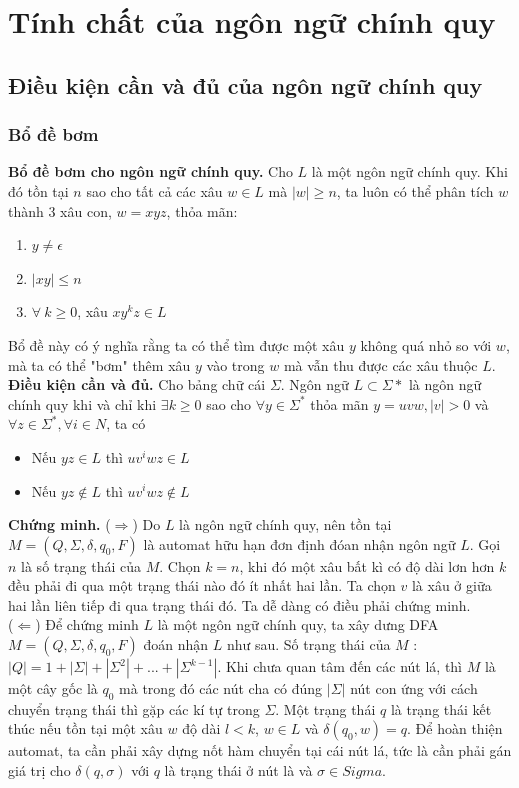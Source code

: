 \documentclass[14pt]{extreport}
\begin{document}
\chapter{Tính chất của ngôn ngữ chính quy}
\section{Điều kiện cần và đủ của ngôn ngữ chính quy}
\subsection{Bổ đề bơm}
\textbf{Bổ đề bơm cho ngôn ngữ chính quy.} Cho $L$ là một ngôn ngữ chính quy. Khi đó tồn tại $n$ sao cho tất cả các xâu $w \in L$ mà $|w| \geq n$, ta luôn có thể phân tích $w$ thành 3 xâu con, $w = xyz$, thỏa mãn:
\begin{enumerate}
\item $y \neq \epsilon$
\item $|xy| \leq n$
\item $\forall \ k \geq 0$, xâu $xy^kz \in L$
\end{enumerate}
Bổ đề này có ý nghĩa rằng ta có thể tìm được một xâu $y$ không quá nhỏ so với $w$, mà ta có thể "bơm" thêm xâu $y$ vào trong $w$ mà vẫn thu được các xâu thuộc $L$.\\
\textbf{Điều kiện cần và đủ.} Cho bảng chữ cái $\Sigma$. Ngôn ngữ $L \subset \Sigma*$ là ngôn ngữ chính quy khi và chỉ khi $\exists k \geq 0$ sao cho $\forall y \in \Sigma^*$ thỏa mãn $y = uvw, |v| > 0$ và $\forall z \in \Sigma^*, \forall i \in N$, ta có
\begin{itemize}
\item Nếu $yz \in L$ thì $uv^iwz \in L$
\item Nếu $yz \notin L$ thì $uv^iwz \notin L$
\end{itemize}
\textbf{Chứng minh.} ($\Rightarrow$) Do $L$ là ngôn ngữ chính quy, nên tồn tại $M = (Q, \Sigma, \delta, q_0, F)$ là automat hữu hạn đơn định đóan nhận ngôn ngữ $L$. Gọi $n$ là số trạng thái của $M$. Chọn $k = n$, khi đó một xâu bất kì có độ dài lơn hơn $k$ đều phải đi qua một trạng thái nào đó ít nhất hai lần. Ta chọn $v$ là xâu ở giữa hai lần liên tiếp đi qua trạng thái đó. Ta dễ dàng có điều phải chứng minh. \\

($\Leftarrow$) Để chứng minh $L$ là một ngôn ngữ chính quy, ta xây dưng DFA $M = (Q, \Sigma, \delta, q_0, F)$ đoán nhận $L$ như sau. Số trạng thái của $M$ :$|Q| = 1 + |\Sigma| + |\Sigma^2| + ... + |\Sigma^{k-1}|$. Khi chưa quan tâm đến các nút lá, thì $M$ là một cây gốc là $q_0$ mà trong đó các nút cha có đúng $|\Sigma|$ nút con ứng với cách chuyển trạng thái thì gặp các kí tự trong $\Sigma$. Một trạng thái $q$ là trạng thái kết thúc nếu tồn tại một xâu $w$ độ dài $l < k$, $w \in L$ và $\delta(q_0, w) = q$. Để hoàn thiện automat, ta cần phải xây dựng nốt hàm chuyển tại cái nút lá, tức là cần phải gán giá trị cho $\delta(q, \sigma)$ với $q$ là trạng thái ở nút là và $\sigma \in Sigma$. \\
\end{document}
